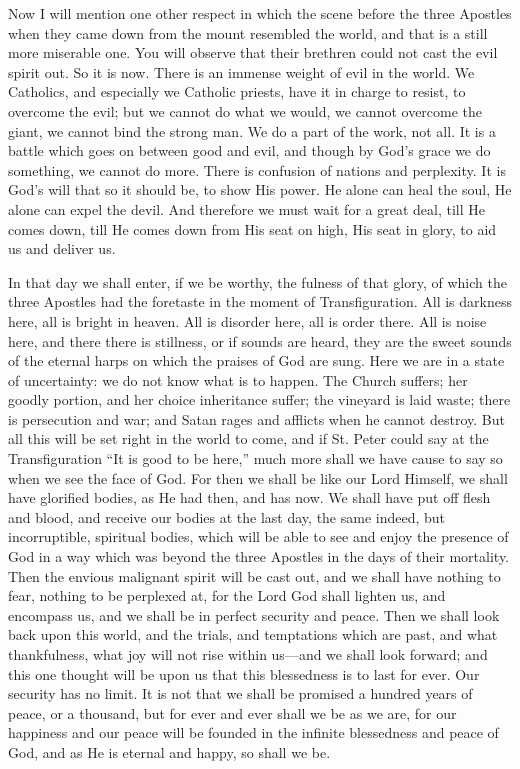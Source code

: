 Now I will mention one other respect in which the
scene before the three Apostles when they came down from the mount
resembled the world, and that is a still more miserable one. You
will observe that their brethren could not cast the evil spirit out.
So it is now. There is an immense weight of evil in the world. We
Catholics, and especially we Catholic priests, have it in charge to
resist, to overcome the evil; but we cannot do what we would, we
cannot overcome the giant, we cannot bind the strong man. We do a part
of the work, not all. It is a battle which goes on between good and
evil, and though by God's grace we do something, we cannot do more.
There is confusion of nations and perplexity. It is God's will that so
it should be, to show His power. He alone can heal the soul, He alone
can expel the devil. And therefore we must wait for a great deal, till
He comes down, till He comes down from His seat on high, His seat in
glory, to aid us and deliver us.

In that day we shall enter, if we be worthy, the
fulness of that glory, of which the three Apostles had the foretaste
in the moment of Transfiguration. All is darkness here, all is bright
in heaven. All is disorder here, all is order there. All is noise
here, and there there is stillness, or if sounds are heard, they are
the sweet sounds of the eternal harps on which the praises of God are
sung. Here we are in a state of uncertainty: we do not know what is to
happen. The Church suffers; her goodly portion, and her choice
inheritance suffer; the vineyard is laid waste; there is persecution
and war; and Satan rages and afflicts when he cannot destroy. But all
this will be set right in the world to come, and if St. Peter
could say at the Transfiguration ``It is good to be here,'' much
more shall we have cause to say so when we see the face of God. For
then we shall be like our Lord Himself, we shall have glorified
bodies, as He had then, and has now. We shall have put off flesh and
blood, and receive our bodies at the last day, the same indeed, but
incorruptible, spiritual bodies, which will be able to see and enjoy
the presence of God in a way which was beyond the three Apostles in
the days of their mortality. Then the envious malignant spirit will be
cast out, and we shall have nothing to fear, nothing to be perplexed
at, for the Lord God shall lighten us, and encompass us, and we shall
be in perfect security and peace. Then we shall look back upon this
world, and the trials, and temptations which are past, and what
thankfulness, what joy will not rise within us—and we shall look
forward; and this one thought will be upon us that this blessedness is
to last for ever. Our security has no limit. It is not that we shall
be promised a hundred years of peace, or a thousand, but for ever and
ever shall we be as we are, for our happiness and our peace will be
founded in the infinite blessedness and peace of God, and as He is
eternal and happy, so shall we be.

